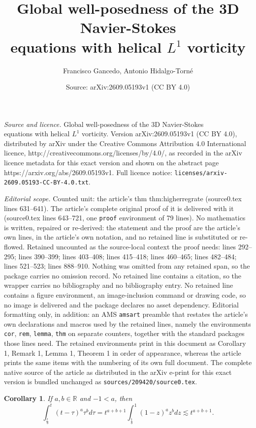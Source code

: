 \documentclass[10pt,a4paper]{amsart}
\title{Global well-posedness of the 3D Navier-Stokes\\ equations with helical $L^1$ vorticity}
\author{Francisco Gancedo, Antonio Hidalgo-Torn\'e}
\date{Source: arXiv:2609.05193v1 (CC BY 4.0)}
\newtheorem{cor}{Corollary}
\newcommand{\R}{\mathbb{R}}
\begin{document}
\maketitle

\noindent\emph{Source and licence.} Global well-posedness of the 3D Navier-Stokes\\ equations with helical $L^1$ vorticity. Version arXiv:2609.05193v1 (CC BY 4.0), distributed by arXiv under the Creative Commons Attribution 4.0 International licence, http://creativecommons.org/licenses/by/4.0/, as recorded in the arXiv licence metadata for this exact version and shown on the abstract page https://arxiv.org/abs/2609.05193v1. Full licence notice: \texttt{licenses/arxiv-2609.05193-CC-BY-4.0.txt}.\par\smallskip

\noindent\textit{Editorial scope.} Counted unit: the article's thm thm:higherregrate (source0.tex lines 631--641). The article's complete original proof of it is delivered with it (source0.tex lines 643--721, one \texttt{proof} environment of 79 lines). No mathematics is written, repaired or re-derived: the statement and the proof are the article's own lines, in the article's own notation, and no retained line is substituted or re-flowed.  Retained uncounted as the source-local context the proof needs: lines 292--295; lines 390--399; lines 403--408; lines 415--418; lines 460--465; lines 482--484; lines 521--523; lines 888--910.  Nothing was omitted from any retained span, so the package carries no omission record.  No retained line contains a citation, so the wrapper carries no bibliography and no bibliography entry.  No retained line contains a figure environment, an image-inclusion command or drawing code, so no image is delivered and the package declares no asset dependency.  Editorial formatting only, in addition: an AMS \texttt{amsart} preamble that restates the article's own declarations and macros used by the retained lines, namely the environments \texttt{cor}, \texttt{rem}, \texttt{lemma}, \texttt{thm} on separate counters, together with the standard packages those lines need.  The retained environments print in this document as Corollary 1, Remark 1, Lemma 1, Theorem 1 in order of appearance, whereas the article prints the same items with the numbering of its own full document.  The complete native source of the article as distributed in the arXiv e-print for this exact version is bundled unchanged as \texttt{sources/209420/source0.tex}.
\begin{cor}\label{cor:intbetatruncated}
If $a,b\in \R$ and $-1<a$, then 
$$\int_{\frac{t}{3}}^t (t-\tau)^a \tau^b d\tau=t^{a+b+1}\int_{\frac{1}{3}}^1 (1-z)^a z^b dz\lesssim  t^{a+b+1}.$$
\end{cor}
\end{document}
